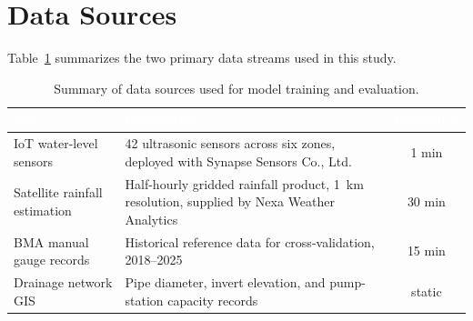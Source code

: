 \section{Data Sources}
Table~\ref{tab:sensors} summarizes the two primary data streams used in this study.

\begin{table}[htbp]
\centering
\caption{Summary of data sources used for model training and evaluation.}
\label{tab:sensors}
\renewcommand{\arraystretch}{1.3}
\begin{tabularx}{\textwidth}{@{}l X c@{}}
\toprule
\rowcolor{chulapink}
\textcolor{white}{\textbf{Source}} & \textcolor{white}{\textbf{Description}} & \textcolor{white}{\textbf{Frequency}} \\
\midrule
IoT water-level sensors & 42 ultrasonic sensors across six zones, deployed with Synapse Sensors Co., Ltd. & 1 min \\
Satellite rainfall estimation & Half-hourly gridded rainfall product, 1~km resolution, supplied by Nexa Weather Analytics & 30 min \\
BMA manual gauge records & Historical reference data for cross-validation, 2018--2025 & 15 min \\
Drainage network GIS & Pipe diameter, invert elevation, and pump-station capacity records & static \\
\bottomrule
\end{tabularx}
\end{table}

